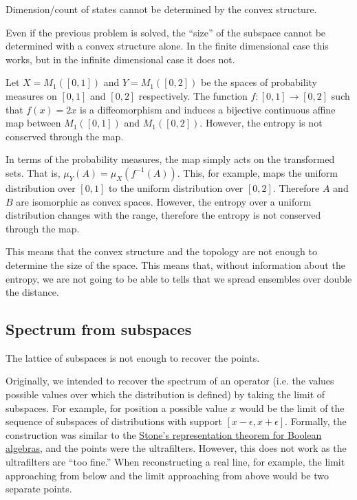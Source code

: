 \begin{insight}
	Dimension/count of states cannot be determined by the convex structure.
\end{insight}

Even if the previous problem is solved, the ``size'' of the subspace cannot be determined with a convex structure alone. In the finite dimensional case this works, but in the infinite dimensional case it does not. 

\begin{prop}
	Let $X=M_1([0,1])$ and $Y=M_1([0,2])$ be the spaces of probability measures on $[0,1]$ and $[0,2]$ respectively. The function $f : [0,1] \to [0,2]$ such that $f(x) = 2x$ is a diffeomorphism and induces a bijective continuous affine map between $M_1([0,1])$ and $M_1([0,2])$. However, the entropy is not conserved through the map.
\end{prop}

\begin{defn}
	In terms of the probability measures, the map simply acts on the transformed sets. That is, $\mu_Y(A) = \mu_X(f^{-1}(A))$. This, for example, maps the uniform distribution over $[0,1]$ to the uniform distribution over $[0,2]$. Therefore $A$ and $B$ are isomorphic as convex spaces. However, the entropy over a uniform distribution changes with the range, therefore the entropy is not conserved through the map.
\end{defn}

This means that the convex structure and the topology are not enough to determine the size of the space. This means that, without information about the entropy, we are not going to be able to tells that we spread ensembles over double the distance.


\subsection{Spectrum from subspaces}

\begin{insight}
	The lattice of subspaces is not enough to recover the points.
\end{insight}

Originally, we intended to recover the spectrum of an operator (i.e. the values possible values over which the distribution is defined) by taking the limit of subspaces. For example, for position a possible value $x$ would be the limit of the sequence of subspaces of distributions with support $[x-\epsilon, x+\epsilon]$. Formally, the construction was similar to the \href{https://en.wikipedia.org/wiki/Stone%27s_representation_theorem_for_Boolean_algebras}{Stone's representation theorem for Boolean algebras}, and the points were the ultrafilters. However, this does not work as the ultrafilters are ``too fine.'' When reconstructing a real line, for example, the limit approaching from below and the limit approaching from above would be two separate points.

